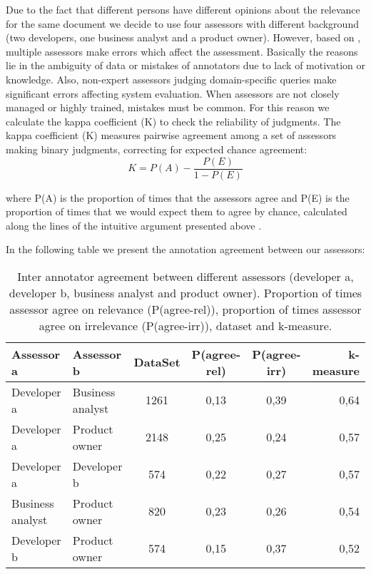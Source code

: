 Due to the fact that different persons have different opinions about the relevance for the same document we decide to use four assessors with different background (two developers, one business analyst and a product owner). However, based on \cite{MaskariSandersonClough}, multiple assessors make errors which affect the assessment. Basically the reasons lie in the ambiguity of data or mistakes of annotators due to lack of motivation or knowledge. Also, non-expert assessors judging domain-specific queries make significant errors affecting system evaluation. When assessors are not closely managed or highly trained, mistakes must be common. For this reason we calculate the kappa coefficient (K) to check the reliability of judgments.
The kappa coefficient (K) measures pairwise agreement among a set of assessors making binary judgments, correcting for expected chance agreement:
\begin{equation}
K= P(A) - \frac{P(E)} {1-P(E)}
\end{equation}

where P(A) is the proportion of times that the assessors agree and P(E) is the proportion of times that we would expect them to agree by chance, calculated along the lines of the intuitive argument presented above \cite{Carletta}.

In the following table we present the annotation agreement between our assessors:

\begin{table}[H]
\begin{center}
\footnotesize
\caption{Inter annotator agreement between different assessors (developer a, developer b, business analyst and product owner). Proportion of times assessor agree on relevance (P(agree-rel)), proportion of times assessor agree on irrelevance (P(agree-irr)), dataset and k-measure. }
\begin{tabular}{llcccr}
\midrule
 Assessor a & Assessor b & DataSet & P(agree-rel) & P(agree-irr) & k-measure \\
 \midrule
	Developer a & Business analyst & 1261 & 0,13 & 0,39 & 0,64 \\
	Developer a & Product owner & 2148 & 0,25 & 0,24 & 0,57 \\
	Developer a & Developer b & 574 & 0,22 & 0,27 & 0,57 \\
	Business analyst & Product owner & 820 & 0,23 & 0,26 & 0,54 \\
	Developer b & Product owner & 574 & 0,15 & 0,37 & 0,52 \\
\bottomrule
\end{tabular}
\end{center}
\end{table}


